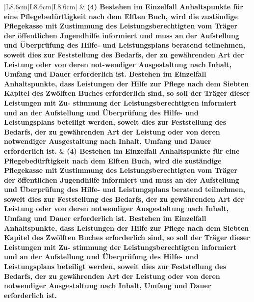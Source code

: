 \documentclass[10pt,a4paper,landscape]{article}
\begin{document}
\begin{longtable}{|L{8.6cm}|L{8.6cm}|L{8.6cm}|}
\hline
 & \textbf{(4) Bestehen im Einzelfall Anhaltspunkte für eine Pflegebedürftigkeit nach dem Elften Buch, wird die zuständige Pflegekasse mit Zustimmung des Leistungsberechtigten vom Träger der öffentlichen Jugendhilfe informiert und muss an der Aufstellung und Überprüfung des Hilfe- und Leistungsplans beratend teilnehmen, soweit dies zur Feststellung des Bedarfs, der zu gewährenden Art der Leistung oder von deren not-wendiger Ausgestaltung nach Inhalt, Umfang und Dauer erforderlich ist. Bestehen im Einzelfall Anhaltspunkte, dass Leistungen der Hilfe zur Pflege nach dem Siebten Kapitel des Zwölften Buches erforderlich sind, so soll der Träger dieser Leistungen mit Zu- \newline stimmung der Leistungsberechtigten informiert und an der Aufstellung und Überprüfung des Hilfe- und Leistungsplans beteiligt werden, soweit dies zur Feststellung des Bedarfs, der zu gewährenden Art der Leistung oder von deren notwendiger Ausgestaltung nach Inhalt, Umfang und Dauer erforderlich ist. } & \textbf{(4) Bestehen im Einzelfall Anhaltspunkte für eine Pflegebedürftigkeit nach dem Elften Buch, wird die zuständige Pflegekasse mit Zustimmung des Leistungsberechtigten vom Träger der öffentlichen Jugendhilfe informiert und muss an der Aufstellung und Überprüfung des Hilfe- und Leistungsplans beratend teilnehmen, soweit dies zur Feststellung des Bedarfs, der zu gewährenden Art der Leistung oder von deren notwendiger Ausgestaltung nach Inhalt, Umfang und Dauer erforderlich ist. Bestehen im Einzelfall Anhaltspunkte, dass Leistungen der Hilfe zur Pflege nach dem Siebten Kapitel des Zwölften Buches erforderlich sind, so soll der Träger dieser Leistungen mit Zu- \newline stimmung der Leistungsberechtigten informiert und an der Aufstellung und Überprüfung des Hilfe- und Leistungsplans beteiligt werden, soweit dies zur Feststellung des Bedarfs, der zu gewährenden Art der Leistung oder von deren notwendiger Ausgestaltung nach Inhalt, Umfang und Dauer erforderlich ist. } \\
\hline

\end{longtable}
\end{document}
